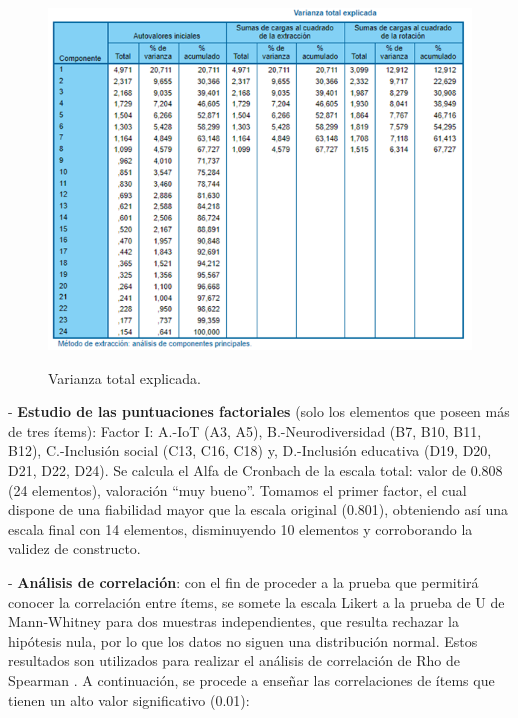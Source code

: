 \documentclass[spanish]{textolivre}
\begin{document}
\begin{figure}[h!]
\centering
\caption{Varianza total explicada.}
\begin{minipage}{1.0\textwidth}
\includegraphics[width=\textwidth]{Tabla03.png}
\label{Tabla03}
\end{minipage}
\end{figure} 

- \textbf{Estudio de las puntuaciones factoriales} (solo los elementos que poseen más de tres ítems):
Factor I: A.-IoT (A3, A5), B.-Neurodiversidad (B7, B10, B11, B12), C.-Inclusión social (C13, C16, C18) y, D.-Inclusión educativa (D19, D20, D21, D22, D24). Se calcula el Alfa de Cronbach de la escala total: valor de 0.808 (24 elementos), valoración “muy bueno”. Tomamos el primer factor, el cual dispone de una fiabilidad mayor que la escala original (0.801), obteniendo así una escala final con 14 elementos, disminuyendo 10 elementos y corroborando la validez de constructo.

- \textbf{Análisis de correlación}: con el fin de proceder a la prueba que permitirá conocer la correlación entre ítems, se somete la escala Likert a la prueba de U de Mann-Whitney para dos muestras independientes, que resulta rechazar la hipótesis nula, por lo que los datos no siguen una distribución normal. Estos resultados son utilizados para realizar el análisis de correlación de Rho de Spearman \cite{fisher_metodos_1949}. A continuación, se procede a enseñar las correlaciones de ítems que tienen un alto valor significativo (0.01):
\end{document}
